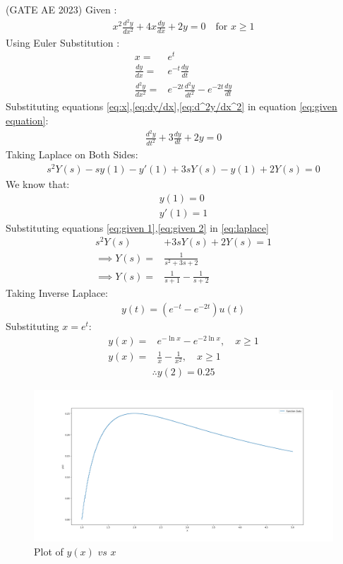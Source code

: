 \documentclass[journal,12pt,twocolumn]{IEEEtran}
\theoremstyle{remark}
\begin{document}
\hfill {(GATE AE 2023)}
\solution
\fi
\noindent Given : 
\begin{align}
x^2\frac{d^2y}{dx^2} + 4x\frac{dy}{dx} + 2y = 0 \quad \text{for } x\geq 1 \label{eq:given equation}
\end{align}
Using Euler Substitution : 
\begin{align}
x= & e^t \label{eq:x}\\
\frac{dy}{dx}= & e^{-t}\frac{dy}{dt}\label{eq:dy/dx}\\
\frac{d^2y}{dx^2} = & e^{-2t}\frac{d^2y}{dt^2} - e^{-2t}\frac{dy}{dt}\label{eq:d^2y/dx^2}
\end{align}
Substituting equations \eqref{eq:x},\eqref{eq:dy/dx},\eqref{eq:d^2y/dx^2} in equation \eqref{eq:given equation}:
\begin{align}
\frac{d^2y}{dt^2} + 3\frac{dy}{dt} + 2y = 0
\end{align}
Taking Laplace on Both Sides:
\begin{align}
s^2 Y(s) - sy(1)-y'(1) + 3{sY(s) - y(1)} + 2Y(s)= 0\label{eq:laplace}
\end{align}
We know that:
\begin{align}
y(1)=0\label{eq:given 1}\\
y'(1)=1\label{eq:given 2}
\end{align}
Substituting equations \eqref{eq:given 1},\eqref{eq:given 2} in \eqref{eq:laplace}
\begin{align}
s^2Y(s)& + 3sY(s) +2Y(s)= 1\\
\implies Y(s)=&\frac{1}{s^2 + 3s + 2 }\\
\implies Y(s)=&\frac{1}{s+1} - \frac{1}{s+2}
\end{align}
Taking Inverse Laplace:
\begin{align}
y(t) = (e^{-t} - e^{-2t})u(t)
\end{align}
Substituting $x=e^t$:
\begin{align}
y(x)=& e^{-\ln{x}} - e^{-2\ln{x}},\quad x\geq 1 \\
y(x)=& \frac{1}{x} - \frac{1}{x^2},\quad x\geq 1 
\end{align}
\begin{align}
    \therefore y(2) = 0.25
\end{align}
\begin{figure}[ht]
    \centering
    \includegraphics[width=\columnwidth]{2023/AE/54/figs/fig.png}
    \caption{Plot of $y(x)$ $vs$ $x$}
    \label{fig: GATE AE-54(2023)}
\end{figure}
\end{document}
